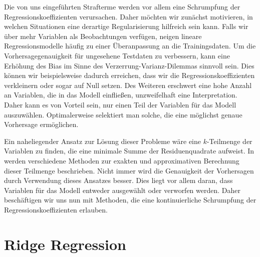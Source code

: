 Die von uns eingeführten Strafterme werden vor allem eine Schrumpfung der Regressionskoeffizienten verursachen. Daher möchten wir zunächst motivieren, in welchen Situationen eine derartige Regularisierung hilfreich sein kann. Falls wir über mehr Variablen als Beobachtungen verfügen, neigen lineare Regressionsmodelle häufig zu einer Überanpassung an die Trainingsdaten. Um die Vorhersagegenauigkeit für ungesehene Testdaten zu verbessern, kann eine Erhöhung des Bias im Sinne des Verzerrung-Varianz-Dilemmas sinnvoll sein. Dies können wir beispielsweise dadurch erreichen, dass wir die Regressionskoeffizienten verkleinern oder sogar auf Null setzen. Des Weiteren erschwert eine hohe Anzahl an Variablen, die in das Modell einfließen, unzweifelhaft eine Interpretation. Daher kann es von Vorteil sein, nur einen Teil der Variablen für das Modell auszuwählen. Optimalerweise selektiert man solche, die eine möglichst genaue Vorhersage ermöglichen.

Ein naheliegender Ansatz zur Lösung dieser Probleme wäre eine $k$-Teilmenge der Variablen zu finden, die eine minimale Summe der Residuenquadrate aufweist. In \cite{hastie_elements} werden verschiedene Methoden zur exakten und approximativen Berechnung dieser Teilmenge beschrieben. Nicht immer wird die Genauigkeit der Vorhersagen durch Verwendung dieses Ansatzes besser. Dies liegt vor allem daran, dass Variablen für das Modell entweder ausgewählt oder verworfen werden. Daher beschäftigen wir uns nun mit Methoden, die eine kontinuierliche Schrumpfung der Regressionskoeffizienten erlauben.




\section{Ridge Regression}
\label{ridge_regression}

